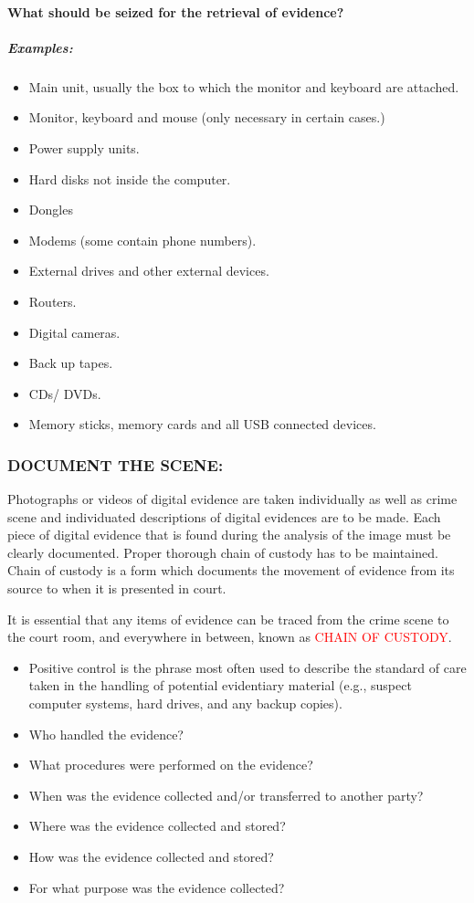 \documentclass[10pt,british,english]{article}
\begin{document}
\paragraph{What should be seized for the retrieval of evidence?}

\subparagraph{Examples:}
\begin{itemize}
\item Main unit, usually the box to which the monitor and keyboard are attached.
\item Monitor, keyboard and mouse (only necessary in certain cases.)
\item Power supply units.
\item Hard disks not inside the computer.
\item Dongles
\item Modems (some contain phone numbers).
\item External drives and other external devices.
\item Routers. 
\item Digital cameras.
\item Back up tapes.
\item CDs/ DVDs.
\item Memory sticks, memory cards and all USB connected devices.
\end{itemize}

\subsubsection{DOCUMENT THE SCENE:}

Photographs or videos of digital evidence are taken individually as
well as crime scene and individuated descriptions of digital evidences
are to be made. Each piece of digital evidence that is found during
the analysis of the image must be clearly documented. Proper thorough
chain of custody has to be maintained. Chain of custody is a form
which documents the movement of evidence from its source to when it
is presented in court.

It is essential that any items of evidence can be traced from the
crime scene to the court room, and everywhere in between, known as
\textcolor{red}{CHAIN OF CUSTODY}. 
\begin{itemize}
\item Positive control is the phrase most often used to describe the standard
of care taken in the handling of potential evidentiary material (e.g.,
suspect computer systems, hard drives, and any backup copies). 
\item Who handled the evidence? 
\item What procedures were performed on the evidence? 
\item When was the evidence collected and/or transferred to another party? 
\item Where was the evidence collected and stored? 
\item How was the evidence collected and stored? 
\item For what purpose was the evidence collected?
\end{itemize}
\end{document}
